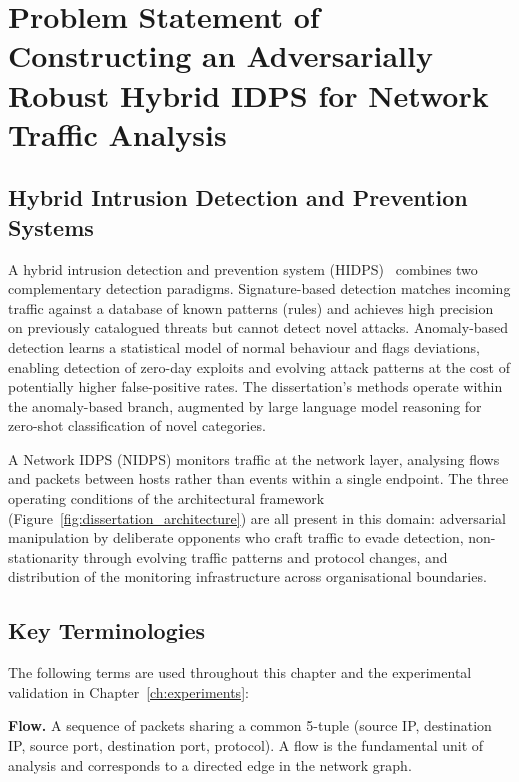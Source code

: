 \section{Problem Statement of Constructing an Adversarially Robust Hybrid IDPS for Network Traffic Analysis}
\label{sec:nidps_context}

\subsection{Hybrid Intrusion Detection and Prevention Systems}

A hybrid intrusion detection and prevention system (HIDPS)~\cite{Buczak2016,Ahmad2021,Aldweesh2020,Ferrag2020,Paxson1999} combines two complementary detection paradigms. Signature-based detection matches incoming traffic against a database of known patterns (rules) and achieves high precision on previously catalogued threats but cannot detect novel attacks. Anomaly-based detection learns a statistical model of normal behaviour and flags deviations, enabling detection of zero-day exploits and evolving attack patterns at the cost of potentially higher false-positive rates. The dissertation's methods operate within the anomaly-based branch, augmented by large language model reasoning for zero-shot classification of novel categories.

A Network IDPS (NIDPS) monitors traffic at the network layer, analysing flows and packets between hosts rather than events within a single endpoint. The three operating conditions of the architectural framework (Figure~\ref{fig:dissertation_architecture}) are all present in this domain: adversarial manipulation by deliberate opponents who craft traffic to evade detection, non-stationarity through evolving traffic patterns and protocol changes, and distribution of the monitoring infrastructure across organisational boundaries.

\subsection{Key Terminologies}

The following terms are used throughout this chapter and the experimental validation in Chapter~\ref{ch:experiments}:

\noindent\textbf{Flow.} A sequence of packets sharing a common 5-tuple (source IP, destination IP, source port, destination port, protocol). A flow is the fundamental unit of analysis and corresponds to a directed edge in the network graph.


